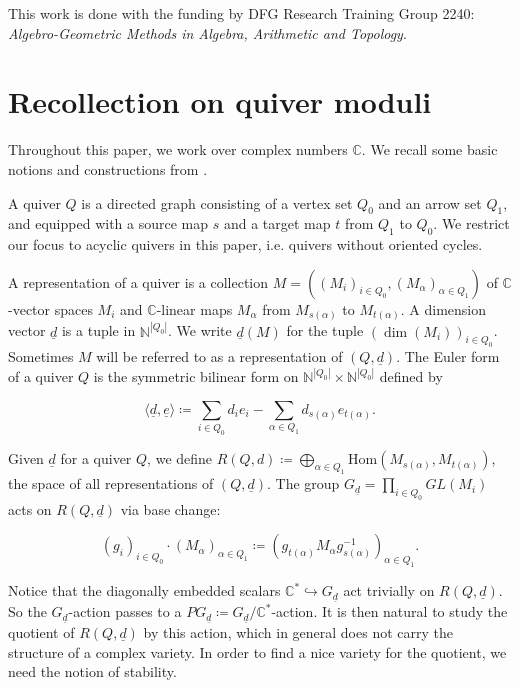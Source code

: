 \documentclass[11pt]{article}
\begin{document}
This work is done with the funding by DFG Research Training Group 2240: \textit{Algebro-Geometric Methods in Algebra, Arithmetic and Topology}. 

\section{Recollection on quiver moduli}\label{Section:2}

Throughout this paper, we work over complex numbers \(\mathbb{C}\). We recall some basic notions and constructions from \cite{Reineke08mo}. 

A quiver \(Q\) is a directed graph consisting of a vertex set \(Q_0\) and an arrow set \(Q_1\), and equipped with a source map \(s\) and a target map \(t\) from \(Q_1\) to \(Q_0\). We restrict our focus to acyclic quivers in this paper, i.e. quivers without oriented cycles. 

A representation of a quiver is a collection \(M = ((M_i)_{i\in Q_0}, (M_{\alpha})_{\alpha\in Q_1})\) of \(\mathbb{C}\)-vector spaces \(M_i\) and \(\mathbb{C}\)-linear maps \(M_{\alpha}\) from \(M_{s(\alpha)}\) to \(M_{t(\alpha)}\). 
A dimension vector \(\underline{d}\) is a tuple in \(\mathbb{N}^{|Q_0|}\). We write \(\underline{d}(M)\) for the tuple \((\dim (M_i))_{i\in Q_0}\). Sometimes \(M\) will be referred to as a representation of \((Q, \underline{d})\). 
The Euler form of a quiver \(Q\) is the symmetric bilinear form on \(\mathbb{N}^{|Q_0|}\times \mathbb{N}^{|Q_0|}\) defined by 

\[
\langle \underline{d}, \underline{e}\rangle \coloneqq \sum_{i\in Q_0}d_ie_i - \sum_{\alpha\in Q_1}d_{s(\alpha)}e_{t(\alpha)}.
\]

Given \(\underline{d}\) for a quiver \(Q\), we define \(R(Q, d)\coloneqq \bigoplus_{\alpha\in Q_1}\mathrm{Hom}(M_{s(\alpha)}, M_{t(\alpha)})\), the space of all representations of \((Q, \underline{d})\). The group \(G_{\underline{d}} = \prod\limits_{i\in Q_0}GL(M_i)\) acts on \(R(Q, \underline{d})\) via base change:

\[
(g_i)_{i\in Q_0}\cdot (M_{\alpha})_{\alpha\in Q_1} \coloneqq (g_{t(\alpha)}M_{\alpha}g_{s(\alpha)}^{-1})_{\alpha\in Q_1}.
\]

Notice that the diagonally embedded scalars \(\mathbb{C}^*\hookrightarrow G_{\underline{d}}\) act trivially on \(R(Q, \underline{d})\). So the \(G_{\underline{d}}\)-action passes to a \(PG_{\underline{d}}\coloneqq G_{\underline{d}}/ \mathbb{C}^*\)-action. It is then natural to study the quotient of \(R(Q, \underline{d})\) by this action, which in general does not carry the structure of a complex variety. In order to find a nice variety for the quotient, we need the notion of stability. 
\end{document}
